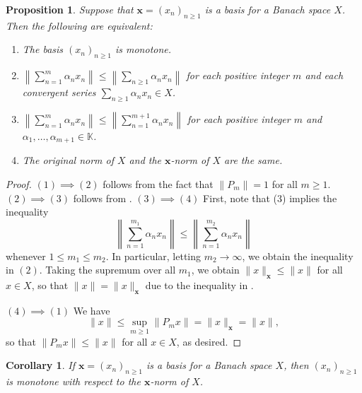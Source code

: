 \documentclass[11pt]{article}
\theoremstyle{thmstyle}
\newtheorem{proposition}[theorem]{Proposition}
\theoremstyle{defstyle}
\newtheorem{corollary}[theorem]{Corollary}
\newcommand{\R}{\mathbb{R}}
\newcommand{\bbC}{\mathbb{C}}
\newcommand{\K}{\mathbb{K}} %
\renewcommand{\le}{\leqslant}
\renewcommand{\ge}{\geqslant}
\begin{document}
\begin{proposition}
	Suppose that $\mathbf x = (x_n)_{n\ge 1}$ is a basis for a Banach space $X$. Then the following are equivalent: 
	\begin{enumerate}[label=(\arabic*)]
		\item The basis $(x_n)_{n\ge 1}$ is monotone. 
		\item $\displaystyle\left\|\sum_{n = 1}^m \alpha_n x_n\right\|\le\left\|\sum_{n\ge 1}\alpha_n x_n\right\|$ for each positive integer $m$ and each convergent series $\displaystyle\sum_{n\ge 1}\alpha_n x_n\in X$.
		\item $\displaystyle\left\|\sum_{n = 1}^{m}\alpha_n x_n\right\|\le\left\|\sum_{n = 1}^{m + 1}\alpha_n x_n\right\|$ for each positive integer $m$ and $\alpha_1,\dots,\alpha_{m + 1}\in\K$.
		\item The original norm of $X$ and the $\mathbf x$-norm of $X$ are the same.
	\end{enumerate}
\end{proposition}
\begin{proof}
	$(1)\implies(2)$ follows from the fact that $\|P_m\| = 1$ for all $m\ge 1$. $(2)\implies(3)$ follows from . $(3)\implies(4)$ First, note that (3) implies the inequality 
	\begin{equation*}
		\left\|\sum_{n = 1}^{m_1} \alpha_n x_n\right\|\le\left\|\sum_{n = 1}^{m_2} \alpha_n x_n\right\|
	\end{equation*}
	whenever $1\le m_1\le m_2$. In particular, letting $m_2\to \infty$, we obtain the inequality in $(2)$. Taking the supremum over all $m_1$, we obtain $\|x\|_{\mathbf x}\le \|x\|$ for all $x\in X$, so that $\|x\| = \|x\|_{\mathbf x}$ due to the inequality in . 

	$(4)\implies(1)$ We have 
	\begin{equation*}
		\|x\|\le \sup_{m\ge 1} \|P_m x\| = \|x\|_{\mathbf x} = \|x\|,
	\end{equation*}
	so that $\|P_mx\|\le \|x\|$ for all $x\in X$, as desired.
\end{proof}

\begin{corollary}
	If $\mathbf x = (x_n)_{n\ge 1}$ is a basis for a Banach space $X$, then $(x_n)_{n\ge 1}$ is monotone with respect to the $\mathbf x$-norm of $X$.
\end{corollary}
\end{document}
